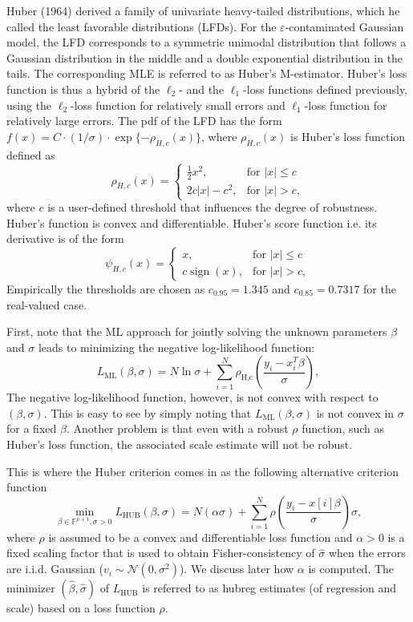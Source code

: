 Huber (1964) derived a family of univariate heavy-tailed distributions, which he called the least favorable distributions (LFDs). For the $\varepsilon$-contaminated Gaussian model, the LFD corresponds to a symmetric unimodal distribution that follows a Gaussian distribution in the middle and a double exponential distribution in the tails. The corresponding MLE is referred to as Huber’s M-estimator. Huber’s loss function is thus a hybrid of the $\ell_2$- and the $\ell_1$-loss functions defined previously, using the $\ell_2$-loss function for relatively small errors and $\ell_1$-loss function for relatively large errors. The pdf of the LFD has the form $f(x) = C \cdot (1/\sigma) \cdot \exp\{-\rho_{H,c}(x)\}$, where $\rho_{H,c}(x)$ is Huber’s loss \cite{huber_loss} function defined as
\[
\rho_{H,c}(x) = \begin{cases} \frac{1}{2}x^2, & \text{for } |x| \leq c \\ 2c|x| - c^2, & \text{for } |x| > c, \end{cases}
\]
where $c$ is a user-defined threshold that influences the degree of robustness. Huber’s function is convex and differentiable. Huber’s score function i.e. its derivative is of the form
\[
\psi_{H,c}(x) = \begin{cases} x, & \text{for } |x| \leq c \\ c \operatorname{sign}(x), & \text{for } |x| > c, \end{cases}
\]
Empirically the thresholds are chosen as $c_{0.95} = 1.345$ and $c_{0.85} = 0.7317$ for the real-valued case.

First, note that the ML approach for jointly solving the unknown parameters $\beta$ and $\sigma$ leads to minimizing the negative log-likelihood function:
\[
L_{\text{ML}}(\beta, \sigma) = N\ln \sigma + \sum_{i=1}^{N} \rho_{\text{H,c}} \left( \frac{y_i - x_i^T \beta}{\sigma} \right),
\]
The negative log-likelihood function, however, is not convex with respect to $(\beta, \sigma)$. This is easy to see by simply noting that $L_{\text{ML}}(\beta, \sigma)$ is not convex in $\sigma$ for a fixed $\beta$. Another problem is that even with a robust $\rho$ function, such as Huber’s loss function, the associated scale estimate will not be robust.

This is where the Huber criterion comes in as the following alternative criterion function
\[
\min_{\beta \in \mathbb{F}^{p+1}, \sigma > 0} L_{\text{HUB}}(\beta, \sigma) = N(\alpha \sigma) + \sum_{i=1}^{N} \rho \left( \frac{y_i - x[i] \beta}{\sigma} \right) \sigma,
\]
where $\rho$ is assumed to be a convex and differentiable loss function and $\alpha > 0$ is a fixed scaling factor that is used to obtain Fisher-consistency of $\hat{\sigma}$ when the errors are i.i.d. Gaussian ($v_i \sim \mathcal{N}(0, \sigma^2)$). We discuss later how $\alpha$ is computed. The minimizer $(\hat{\beta}, \hat{\sigma})$ of $L_{\text{HUB}}$ is referred to as hubreg estimates (of regression and scale) based on a loss function $\rho$.

